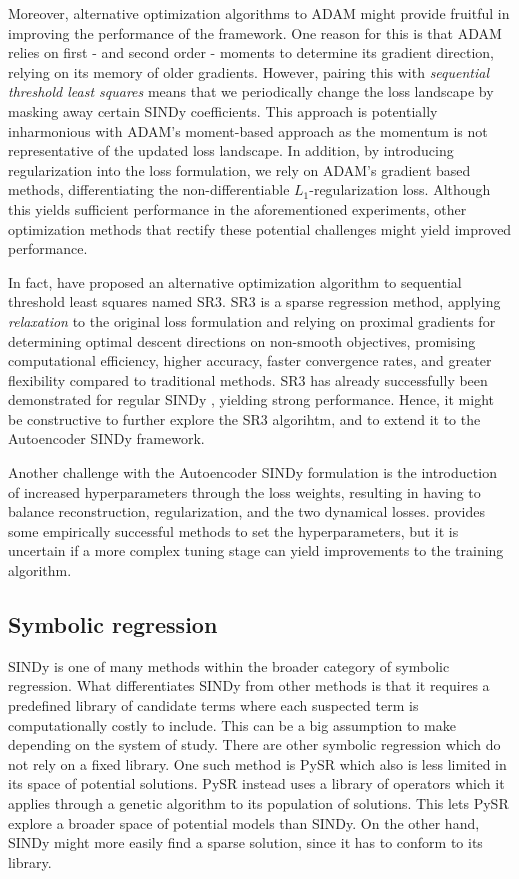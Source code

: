 Moreover, alternative optimization algorithms to \textsc{ADAM} might provide fruitful in improving the performance of the framework. 
One reason for this is that \textsc{ADAM} relies on first - and second order - moments to determine its gradient direction, relying on its memory of older gradients. 
However, pairing this with \textit{sequential threshold least squares} means that we periodically change the loss landscape by masking away certain SINDy coefficients. 
This approach is potentially inharmonious with \textsc{ADAM}'s moment-based approach as the momentum is not representative of the updated loss landscape. 
In addition, by introducing regularization into the loss formulation, we rely on \textsc{ADAM}'s gradient based methods, differentiating the non-differentiable $L_1$-regularization loss.
Although this yields sufficient performance in the aforementioned experiments, other optimization methods that rectify these potential challenges might yield improved performance. 

In fact, \textcite{SR3} have proposed an alternative optimization algorithm to sequential threshold least squares named SR3. 
SR3 is a sparse regression method, applying \textit{relaxation} to the original loss formulation and relying on proximal gradients for determining optimal descent directions on non-smooth objectives, promising computational efficiency, higher accuracy, faster convergence rates, and greater flexibility compared to traditional methods. 
SR3 has already successfully been demonstrated for regular SINDy \cite{SR3_SINDy}, yielding strong performance. 
Hence, it might be constructive to further explore the SR3 algorihtm, and to extend it to the Autoencoder SINDy framework. 

Another challenge with the Autoencoder SINDy formulation is the introduction of increased hyperparameters through the loss weights, resulting in having to balance reconstruction, regularization, and the two dynamical losses. 
\textcite{Champion_2019} provides some empirically successful methods to set the hyperparameters, but it is uncertain if a more complex tuning stage can yield improvements to the training algorithm.

\subsection{Symbolic regression}
SINDy is one of many methods within the broader category of symbolic regression. What differentiates SINDy from other methods is that it requires a predefined library of candidate terms where each suspected term is computationally costly to include. This can be a big assumption to make depending on the system of study. There are other symbolic regression which do not rely on a fixed library. One such method is PySR \cite{cranmer2020discovering} which also is less limited in its space of potential solutions. PySR instead uses a library of operators which it applies through a genetic algorithm to its population of solutions. This lets PySR explore a broader space of potential models than SINDy. On the other hand, SINDy might more easily find a sparse solution, since it has to conform to its library. 

